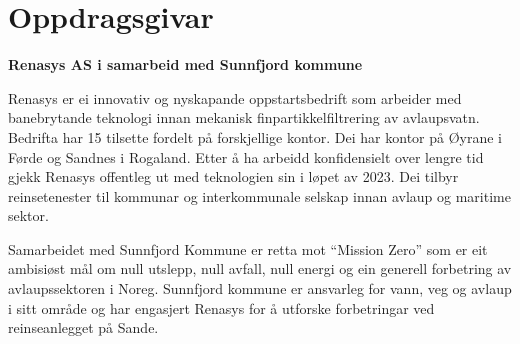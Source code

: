\section{Oppdragsgivar}
\textbf{Renasys AS i samarbeid med Sunnfjord kommune}

\gls{Renasys} er ei innovativ og nyskapande oppstartsbedrift som arbeider med banebrytande teknologi innan mekanisk finpartikkelfiltrering av avlaupsvatn.
Bedrifta har 15 tilsette fordelt på forskjellige kontor. Dei har kontor på Øyrane i Førde og Sandnes i Rogaland. 
Etter å ha arbeidd konfidensielt over lengre tid gjekk Renasys offentleg ut med teknologien sin i løpet av 2023. 
Dei tilbyr reinsetenester til kommunar og interkommunale selskap innan avlaup og maritime sektor.

Samarbeidet med \gls{Sunnfjord Kommune} er retta mot ``Mission Zero'' som er eit ambisiøst mål om 
null utslepp, null avfall, null energi og ein generell forbetring av avlaupssektoren i Noreg. \citep{Zero} \newline
Sunnfjord kommune er ansvarleg for vann, veg og avlaup i sitt område og har engasjert 
Renasys for å utforske forbetringar ved reinseanlegget på Sande.
\newline
\newline


